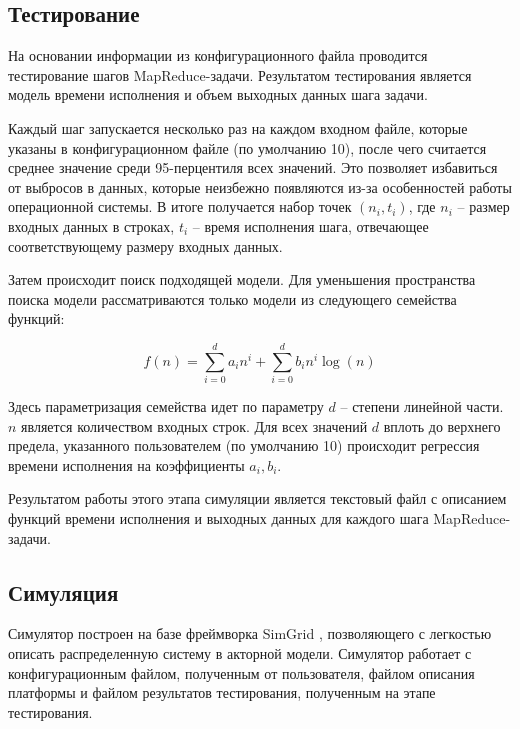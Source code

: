 \documentclass[a4paper,12pt]{article}
\begin{document}
    \subsection{Тестирование}

    На основании информации из конфигурационного файла проводится тестирование
    шагов MapReduce-задачи. Результатом тестирования является модель времени
    исполнения и объем выходных данных шага задачи.

    Каждый шаг запускается несколько раз на каждом входном файле, которые
    указаны в конфигурационном файле (по умолчанию 10), после чего считается
    среднее значение среди 95-перцентиля всех значений. Это позволяет избавиться
    от выбросов в данных, которые неизбежно появляются из-за особенностей работы
    операционной системы. В итоге получается набор точек $(n_i, t_i)$, где $n_i$
    -- размер входных данных в строках, $t_i$ -- время исполнения шага,
    отвечающее соответствующему размеру входных данных.
    
    Затем происходит поиск подходящей модели. Для уменьшения пространства поиска
    модели рассматриваются только модели из следующего семейства функций:
    
    \begin{equation} 
        f(n) = \sum_{i = 0}^d a_in^i + \sum_{i=0}^d b_in^i\log(n)
    \end{equation} 

    Здесь параметризация семейства идет по параметру $d$ -- степени линейной
    части. $n$ является количеством входных строк. Для всех значений $d$ вплоть
    до верхнего предела, указанного пользователем (по умолчанию 10) происходит
    регрессия времени исполнения на коэффициенты $a_i, b_i$. 
    
    Результатом работы этого этапа симуляции является текстовый файл с описанием
    функций времени исполнения и выходных данных для каждого шага
    MapReduce-задачи.

    \subsection{Симуляция}

    Симулятор построен на базе фреймворка SimGrid \cite{simgrid}, позволяющего с
    легкостью описать распределенную систему в акторной модели. Симулятор
    работает с конфигурационным файлом, полученным от пользователя, файлом
    описания платформы и файлом результатов тестирования, полученным на этапе
    тестирования. 
\end{document}
